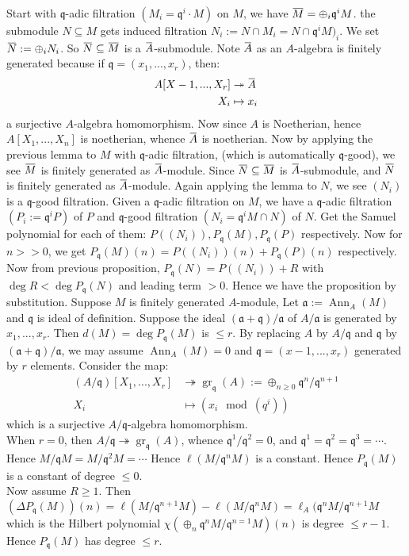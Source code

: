 \documentclass[12pt]{article}
\theoremstyle{definition}
\theoremstyle{plain}
\DeclareMathOperator{\Ann}{Ann}
\DeclareMathOperator{\gr}{gr}
\newcommand{\surj}{\twoheadrightarrow}
\newcommand{\overbar}[1]{\mkern 1.5mu\overline{\mkern-1.5mu#1\mkern-1.5mu}\mkern 1.5mu}
\renewcommand{\bar}{\overbar}
\begin{document}
 Start with $\mathfrak{q}$-adic filtration $(M_i=\mathfrak{q}^i\cdot M)$ on $M$, we have $\bar{M}=\oplus_i\mathfrak{q}^iM$. the submodule $N\subseteq M$ gets induced filtration $N_i:=N\cap M_i=N\cap \mathfrak{q}^iM)_i$. We set $\bar{N}:=\oplus_i N_i$. So $\bar{N}\subseteq \bar{M}$ is a $\bar{A}$-submodule. Note $\bar{A}$ as an $A$-algebra is finitely generated because if $\mathfrak{q}=(x_1, ..., x_r)$, then:
\begin{align*}
  A[X-1, ..., X_r]&\surj \bar{A}\\
  X_i&\mapsto x_i
\end{align*}
a surjective $A$-algebra homomorphism. Now since $A$ is Noetherian, hence $A[X_1, ..., X_n]$ is noetherian, whence $\bar{A}$ is noetherian. Now by applying the previous lemma to $M$ with $\mathfrak{q}$-adic filtration, (which is automatically $\mathfrak{q}$-good), we see $\bar{M}$ is finitely generated as $\bar{A}$-module. Since $\bar{N}\subseteq \bar{M}$ is $\bar{A}$-submodule, and $\bar{N}$ is finitely generated as $\bar{A}$-module. Again applying the lemma to $N$, we see $(N_i)$ is a $\mathfrak{q}$-good filtration.
Given a $\mathfrak{q}$-adic filtration on $M$, we have a $\mathfrak{q}$-adic filtration $(P_i:=\mathfrak{q}^iP)$ of $P$ and $\mathfrak{q}$-good filtration $(N_i=\mathfrak{q}^iM\cap N)$ of $N$. Get the Samuel polynomial for each of them: $P((N_i)), P_\mathfrak{q}(M), P_\mathfrak{q}(P)$ respectively. Now for $n>>0$, we get $P_\mathfrak{q}(M)(n)=P((N_i))(n)+P_\mathfrak{q}(P)(n)$ respectively. Now from previous proposition, $P_\mathfrak{q}(N)=P((N_i))+R$ with $\deg R<\deg P_\mathfrak{q}(N)$ and leading term $>0$. Hence we have the proposition by substitution.
\Prop Suppose $M$ is finitely generated $A$-module,  Let $\mathfrak{a}:=\Ann_A(M)$ and $\mathfrak{q}$ is ideal of definition. Suppose the ideal $(\mathfrak{a}+\mathfrak{q})/\mathfrak{a}$ of $A/\mathfrak{a}$ is generated by $x_1, ..., x_r$. Then $d(M)=\deg P_\mathfrak{q}(M)$ is $\leq r$.
\proof By replacing $A$ by $A/\mathfrak{q}$ and $\mathfrak{q}$ by $(\mathfrak{a}+\mathfrak{q})/\mathfrak{a}$, we may assume $\Ann_A(M)=0$ and $\mathfrak{q}=(x-1, ..., x_r)$ generated by $r$ elements. Consider the map:
\begin{align*}
  (A/\mathfrak{q})[X_1, ..., X_r]&\surj \gr_\mathfrak{q}(A):=\oplus_{n\geq 0} \mathfrak{q}^n/\mathfrak{q}^{n+1}\\
  X_i&\mapsto (x_i\mod(q^i))
\end{align*}
which is a surjective $A/\mathfrak{q}$-algebra homomorphism.\\
\indent When $r=0$, then $A/\mathfrak{q}\surj \gr_\mathfrak{q}(A)$, whence $\mathfrak{q}^1/\mathfrak{q}^2=0$, and $\mathfrak{q}^1=\mathfrak{q}^2=\mathfrak{q}^3=\cdots$. Hence $M/\mathfrak{q}M=M/\mathfrak{q}^2M=\cdots$ Hence $\ell(M/\mathfrak{q}^nM)$ is a constant. Hence $P_\mathfrak{q}(M)$ is a constant of degree $\leq 0$.\\
\indent Now assume $R\geq 1$. Then $(\Delta P_\mathfrak{q}(M))(n)=\ell(M/\mathfrak{q}^{n+1}M)-\ell(M/\mathfrak{q}^nM)=\ell_A(\mathfrak{q}^nM/\mathfrak{q}^{n+1}M$ which is the Hilbert polynomial $\chi(\oplus_n \mathfrak{q}^nM/\mathfrak{q}^{n=1}M)(n)$ is degree $\leq r-1$. Hence $P_\mathfrak{q}(M)$ has degree $\leq r$.
\end{document}
